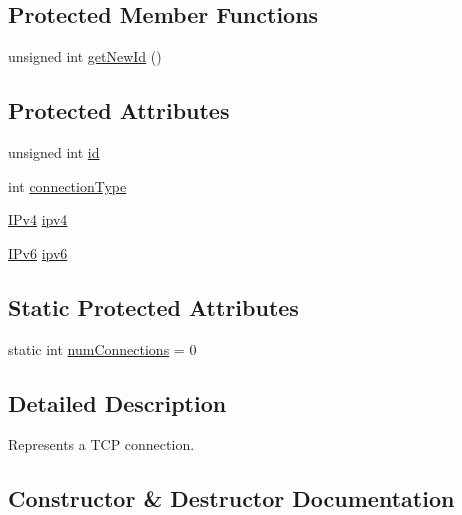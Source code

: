 \subsection*{Protected Member Functions}
\begin{DoxyCompactItemize}
\item 
unsigned int \hyperlink{class_rad_jav_1_1_networking_1_1_t_c_p_connection_a059b55bb7b6d16d0f0cd0f633f5eda5c}{get\+New\+Id} ()
\end{DoxyCompactItemize}
\subsection*{Protected Attributes}
\begin{DoxyCompactItemize}
\item 
unsigned int \hyperlink{class_rad_jav_1_1_networking_1_1_t_c_p_connection_a02dd1869a173c7567f473ab191a38d60}{id}
\item 
int \hyperlink{class_rad_jav_1_1_networking_1_1_t_c_p_connection_ad256d7aa9e03d9257e48f1affe932b4f}{connection\+Type}
\item 
\hyperlink{class_rad_jav_1_1_networking_1_1_i_pv4}{I\+Pv4} \hyperlink{class_rad_jav_1_1_networking_1_1_t_c_p_connection_a68043155a46037630c9e0689f12cc1da}{ipv4}
\item 
\hyperlink{class_rad_jav_1_1_networking_1_1_i_pv6}{I\+Pv6} \hyperlink{class_rad_jav_1_1_networking_1_1_t_c_p_connection_a2f2016ef5e44febe49accb50784f62cc}{ipv6}
\end{DoxyCompactItemize}
\subsection*{Static Protected Attributes}
\begin{DoxyCompactItemize}
\item 
static int \hyperlink{class_rad_jav_1_1_networking_1_1_t_c_p_connection_ad1ed3c88e6ee99be735b8c846ab70749}{num\+Connections} = 0
\end{DoxyCompactItemize}


\subsection{Detailed Description}
Represents a T\+CP connection. 

\subsection{Constructor \& Destructor Documentation}
